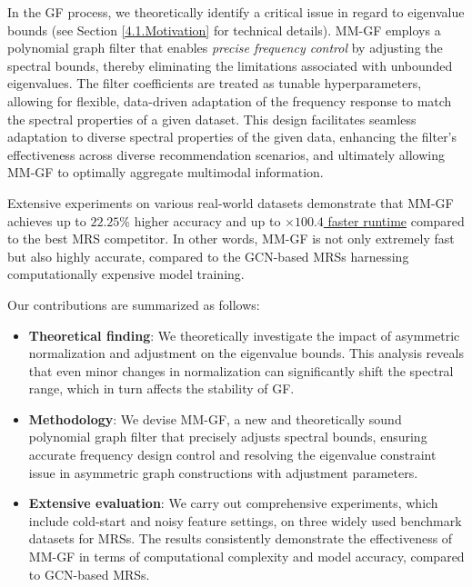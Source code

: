 \documentclass[a4paper,fleqn]{cas-sc}
\begin{document}
In the GF process, we theoretically identify a critical issue in regard to eigenvalue bounds (see Section \ref{4.1.Motivation} for technical details). \textsf{MM-GF} employs a polynomial graph filter that enables {\it precise frequency control} by adjusting the spectral bounds, thereby eliminating the limitations associated with unbounded eigenvalues. The filter coefficients are treated as tunable hyperparameters, allowing for flexible, data-driven adaptation of the frequency response to match the spectral properties of a given dataset. This design facilitates seamless adaptation to diverse spectral properties of the given data, enhancing the filter’s effectiveness across diverse recommendation scenarios, and ultimately allowing \textsf{MM-GF} to optimally aggregate multimodal information. 

Extensive experiments on various real-world datasets demonstrate that \textsf{MM-GF} achieves up to $22.25$\% higher accuracy and up to \underline{$\times 100.4$ faster runtime} compared to the best MRS competitor. In other words, \textsf{MM-GF} is not only extremely fast but also highly accurate, compared to the GCN-based MRSs harnessing computationally expensive model training.

Our contributions are summarized as follows:
\begin{itemize}
    \item {\bf Theoretical finding}: We theoretically investigate the impact of asymmetric normalization and adjustment on the eigenvalue bounds. This analysis reveals that even minor changes in normalization can significantly shift the spectral range, which in turn affects the stability of GF.
    
    \item {\bf Methodology}: We devise \textsf{MM-GF}, a new and theoretically sound polynomial graph filter that precisely adjusts spectral bounds, ensuring accurate frequency design control and resolving the eigenvalue constraint issue in asymmetric graph constructions with adjustment parameters.

    \item {\bf Extensive evaluation}: We carry out comprehensive experiments, which include cold-start and noisy feature settings, on three widely used benchmark datasets for MRSs. The results consistently demonstrate the effectiveness of \textsf{MM-GF} in terms of computational complexity and model accuracy, compared to GCN-based MRSs.
\end{itemize}
\end{document}
